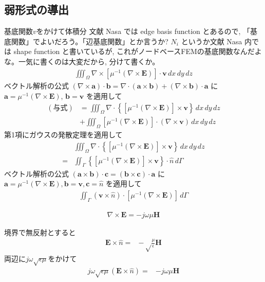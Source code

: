 \subsection{弱形式の導出}

基底関数$v$をかけて体積分
文献 Nasa では edge basis function とあるので,
「基底関数」でよいだろう。「辺基底関数」とか言うか?
$N_i$ というか文献 Nasa 内では shape function と書いているが,
これがノードベースFEMの基底関数なんだよな。一気に書くのは大変だから,
分けて書くか。
\begin{align}
\iiint_\Omega\nabla\times\left[
\mu^{-1}\left(\nabla\times\bm{E}\right)
\right]\cdot\bm{v}\,dx\,dy\,dz
\end{align}
ベクトル解析の公式
$\left(\nabla\times\bm{a}\right)\cdot\bm{b}
=\nabla\cdot\left(\bm{a}\times\bm{b}\right)
+\left(\nabla\times\bm{b}\right)\cdot\bm{a}$
に$\bm{a}=\mu^{-1}\left(\nabla\times\bm{E}\right)$, $\bm{b}=\bm{v}$
を適用して
\begin{align}
(\textrm{与式})&=
\iiint_\Omega\nabla\cdot
\left\{\left[\mu^{-1}
\left(\nabla\times\bm{E}\right)
\right]\times\bm{v}\right\}\,dx\,dy\,dz\\
&+\iiint_\Omega\left[\mu^{-1}\left(\nabla\times\bm{E}\right)\right]\cdot
\left(\nabla\times\bm{v}\right)\,dx\,dy\,dz
\end{align}
第1項にガウスの発散定理を適用して
\begin{align}
&\iiint_{\Omega}\nabla\cdot
\left\{\left[\mu^{-1}\left(\nabla\times\bm{E}\right)\right]\times\bm{v}\right\}
\,dx\,dy\,dz\\
=&\iint_\Gamma
\left\{\left[
\mu^{-1}\left(\nabla\times\bm{E}\right)
\right]\times\bm{v}\right\}\cdot\hat{n}
\,d\Gamma
\end{align}
ベクトル解析の公式
$\left(\bm{a}\times\bm{b}\right)\cdot\bm{c}
=\left(\bm{b}\times\bm{c}\right)\cdot\bm{a}$
に
$\bm{a}=\mu^{-1}\left(\nabla\times\bm{E}\right),
 \bm{b}=\bm{v}, \bm{c}=\hat{n}$
を適用して
\begin{align}
\iint_\Gamma
\left(\bm{v}\times\hat{n}\right)\cdot
\left[\mu^{-1}\left(\nabla\times\bm{E}\right)
\right]\,d\Gamma
\end{align}

\begin{align}
\nabla\times\bm{E}=-j\omega\mu\bm{H}
\end{align}

境界で無反射とすると
\begin{align}
\bm{E}\times\hat{n}=&-\sqrt\frac{\mu}{\epsilon}\bm{H}
\end{align}
両辺に$j\omega\sqrt{\epsilon\mu}$をかけて
\begin{align}
j\omega\sqrt{\epsilon\mu}\left(\bm{E}\times\hat{n}\right)=&-j\omega\mu\bm{H}
\end{align}

